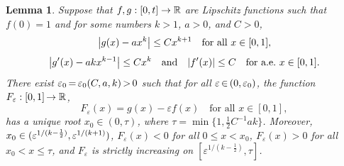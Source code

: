 \documentclass[10pt]{amsart}
\newtheorem{lemm}[theo]{Lemma}\newtheorem{prop}[theo]{Proposition}\newtheorem{coro}[theo]{Corollary}\newtheorem{conj}[theo]{Conjecture}
\theoremstyle{definition}\newtheorem{defi}[theo]{Definition}\newtheorem{rema}[theo]{Remark}\newtheorem{exam}[theo]{Example}\newtheorem{exem}[theo]{Example}\newtheorem{nota}[theo]{Notation}
\newcommand{\R}{\mathbb{R}}
\renewcommand{\epsilon}{\varepsilon}
\newcommand*{\Mk}{\mkern -2mu}
\renewcommand*{\to}{\mathchoice{\longrightarrow}{\rightarrow}{\rightarrow}{\rightarrow}}
\let\originalleft\left
\let\originalright\right
\renewcommand{\left}{\mathopen{}\mathclose\bgroup\originalleft}
\renewcommand{\right}{\aftergroup\egroup\originalright}
\begin{document}
\begin{lemm}\label{lem:z_pert_1}
Suppose that $f,g:[0,t]\to\R$ are Lipschitz functions such that $f(0)=1$ and for some numbers $k>1$, $a>0$, and $C>0$,
\begin{equation}
\left|g(x)-a x^k\right|\leq C x^{k+1}\quad\text{for all $x\in[0,1]$,}
\end{equation}
\begin{equation}
\left|g'(x)-ak x^{k-1}\right|\leq C x^{k}\quad\text{and}\quad \left|f'(x)\right|\leq C\quad\text{for a.e.~$x\in[0,1]$.}
\end{equation}
There exist $\epsilon_0\Mk=\Mk\epsilon_0(C,a,k)\Mk>\Mk0$ such that for all $\epsilon\Mk \in\Mk (0, \epsilon_0)$, the function ${F_\epsilon:[0,1]\Mk\to\R}$,
\begin{equation}
F_\epsilon(x) = g(x) - \epsilon f(x)\quad\text{for all $x\in[0,1]$},
\end{equation}
has a unique root $x_0\in(0,\tau)$, where $\tau=\min\{1,\frac{1}{2}C^{-1}ak\}$. Moreover, $x_0\in (\epsilon^{1/(k-\frac12)},\linebreak\epsilon^{1/(k+1)})$, $F_\epsilon(x)<0$ for all $0\leq x<x_0$, $F_\epsilon(x)>0$ for all $x_0<x\leq \tau$, and $F_\epsilon$ is strictly increasing on $[\epsilon^{1/(k-\frac12)},\tau]$.
\end{lemm}
\end{document}
